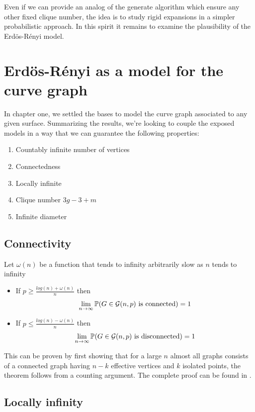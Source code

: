 Even if we can provide an analog of the generate algorithm which ensure any other fixed clique number, the idea is to study rigid expansions in a simpler probabilistic approach. In this spirit it remains to examine the plausibility of the Erdös-Rényi model.

\section{Erdös-Rényi as a model for the curve graph}
In chapter one, we settled the bases to model the curve graph associated to any given surface. Summarizing the results, we're looking to couple the exposed models in a way that we can guarantee the following properties:

\begin{enumerate}
\item Countably infinite number of vertices
\item Connectedness
\item Locally infinite
\item Clique number $3g-3+m$
\item Infinite diameter
\end{enumerate}

\subsection{Connectivity}
\begin{theorem}
Let $\omega(n)$ be a function that tends to infinity arbitrarily slow as $n$ tends to infinity
\begin{itemize}
\item If $p\geq \frac{log(n)+ \omega(n)}{n}$ then 
$$\lim_{n \to \infty} \mathbb{P}(G \in \mathcal{G}(n,p) \text{ is connected}) = 1$$
\item If $p\leq \frac{log(n)- \omega(n)}{n}$ then
$$\lim_{n \to \infty} \mathbb{P}(G \in \mathcal{G}(n,p) \text{ is disconnected}) = 1$$
\end{itemize}
\end{theorem}
 
This can be proven by first showing that for a large $n$ almost all graphs consists of a connected graph having $n-k$ effective vertices and $k$ isolated points, the theorem follows from a counting argument. The complete proof can be found in \cite[Erdös-Rényi, 59]{OnRandomGraphs}.
 
\subsection{Locally infinity}

